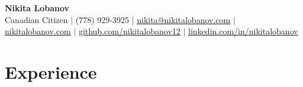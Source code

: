 \documentclass[a4paper,10pt]{article}
\begin{document}
\begin{center}
  \textbf{\Huge Nikita Lobanov} \\
  \vspace{4pt}
  \footnotesize
  Canadian Citizen $|$ (778) 929-3925 $|$
  \href{mailto:nikita@nikitalobanov.com}{\underline{nikita@nikitalobanov.com}} $|$
  \href{https://nikitalobanov.com}{\underline{nikitalobanov.com}} $|$
  \href{https://github.com/nikitalobanov12}{\underline{github.com/nikitalobanov12}} $|$
  \href{https://linkedin.com/in/nikitalobanov}{\underline{linkedin.com/in/nikitalobanov}}
\end{center}

\section{Experience}
\end{document}
